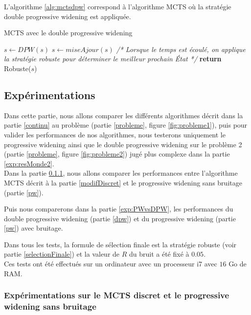 \documentclass[pdftex,french, english]{article}	%
\begin{document}
			L'algorithme \ref{alg:mctsdpw} correspond à l'algorithme MCTS où la stratégie double progressive widening est appliquée. 
			\begin{algorithm}[H]
			\centering
			\caption{MCTS avec le double progressive widening}
			\label{alg:mctsdpw}
				\begin{algorithmic}[1]
								\State $s \gets DPW(s)$ 
							\EndWhile
						\State $s \gets miseAjour(s)$
						\EndWhile
						\State \textit{/* Lorsque le temps est écoulé, on applique la stratégie robuste pour déterminer le meilleur prochain État */}
					\State \textbf{return} Robuste($s$)
					\EndFunction
				\end{algorithmic}
		\end{algorithm}
\subsection{Expérimentations} \label{exp}
	
    Dans cette partie, nous allons comparer les différents algorithmes décrit dans la partie \ref{continu} au problème (partie \ref{probleme}, figure \ref{fig:probleme1}), puis pour valider les performances de nos algorithmes, nous testerons uniquement le progressive widening ainsi que le double progressive widening sur le problème 2 (partie \ref{probleme}, figure \ref{fig:probleme2}) jugé plus complexe dans la partie \ref{exp:resMonde2}.\\
    
    Dans la partie \ref{exp:MCTSvsPW}, nous allons comparer les performances entre l'algorithme MCTS décrit à la partie \ref{modifDiscret} et le progressive widening sans bruitage (partie \ref{pw}).

Puis nous comparerons dans la partie \ref{exp:PWvsDPW}, les performances du double progressive widening (partie \ref{dpw}) et du progressive widening (partie \ref{pw}) avec bruitage. 
	
    Dans tous les tests, la formule de sélection finale est la stratégie robuste (voir partie \ref{selectionFinale}) et la valeur de $R$ du bruit a été fixé à $0.05$. \\
    
    Ces tests ont été effectués sur un ordinateur avec un processeur i7 avec $16$ Go de RAM.

	\subsubsection{Expérimentations sur le MCTS discret et le progressive widening sans bruitage} \label{exp:MCTSvsPW}  
    
\end{document}
